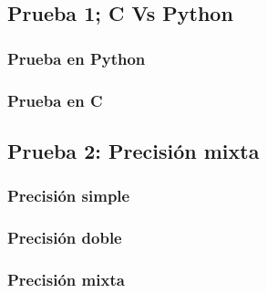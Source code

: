 \subsection{Prueba 1; C Vs Python}
\label{prueba:cvspython}

\subsubsection{Prueba en Python}


\subsubsection{Prueba en C}


\newpage
\subsection{Prueba 2: Precisión mixta}
\label{prueba:mixta}
\subsubsection{Precisión simple}


\newpage
\subsubsection{Precisión doble}


\newpage
\subsubsection{Precisión mixta}

\fi